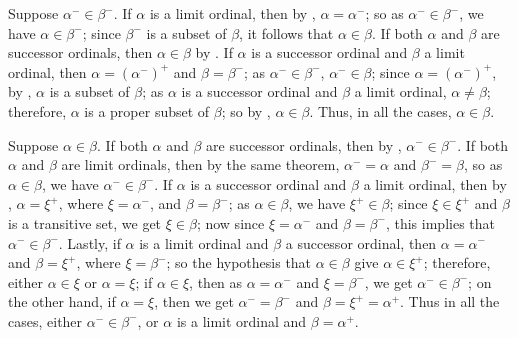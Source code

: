\documentclass{article}
\begin{document}
\begin{solution}[\ref{exe:7tvca54w}]
  \label{sol:45jmdyf7}
  Suppose \(\alpha^- \in \beta^-\).  If \(\alpha\) is a limit ordinal,
  then by , \(\alpha = \alpha^-\); so as
  \(\alpha^- \in \beta^-\), we have \(\alpha \in \beta^-\); since
  \(\beta^-\) is a subset of \(\beta\), it follows that
  \(\alpha \in \beta\).  If both \(\alpha\) and \(\beta\) are
  successor ordinals, then \(\alpha \in \beta\) by
  .  If \(\alpha\) is a successor ordinal and
  \(\beta\) a limit ordinal, then \(\alpha = (\alpha^-)^+\) and
  \(\beta = \beta^-\); as \(\alpha^- \in \beta^-\),
  \(\alpha^- \in \beta\); since \(\alpha = (\alpha^-)^+\), by
  , \(\alpha\) is a subset of \(\beta\); as
  \(\alpha\) is a successor ordinal and \(\beta\) a limit ordinal,
  \(\alpha \neq \beta\); therefore, \(\alpha\) is a proper subset of
  \(\beta\); so by , \(\alpha \in \beta\).  Thus,
  in all the cases, \(\alpha \in \beta\).

  Suppose \(\alpha \in \beta\).  If both \(\alpha\) and \(\beta\) are
  successor ordinals, then by ,
  \(\alpha^- \in \beta^-\).  If both \(\alpha\) and \(\beta\) are
  limit ordinals, then by the same theorem, \(\alpha^- = \alpha\) and
  \(\beta^- = \beta\), so as \(\alpha \in \beta\), we have
  \(\alpha^- \in \beta^-\).  If \(\alpha\) is a successor ordinal and
  \(\beta\) a limit ordinal, then by ,
  \(\alpha = \xi^+\), where \(\xi = \alpha^-\), and
  \(\beta = \beta^-\); as \(\alpha \in \beta\), we have
  \(\xi^+ \in \beta\); since \(\xi \in \xi^+\) and \(\beta\) is a
  transitive set, we get \(\xi \in \beta\); now since
  \(\xi = \alpha^-\) and \(\beta = \beta^-\), this implies that
  \(\alpha^- \in \beta^-\).  Lastly, if \(\alpha\) is a limit ordinal
  and \(\beta\) a successor ordinal, then \(\alpha = \alpha^-\) and
  \(\beta = \xi^+\), where \(\xi = \beta^-\); so the hypothesis that
  \(\alpha \in \beta\) give \(\alpha \in \xi^+\); therefore, either
  \(\alpha \in \xi\) or \(\alpha = \xi\); if \(\alpha \in \xi\), then
  as \(\alpha = \alpha^-\) and \(\xi = \beta^-\), we get
  \(\alpha^- \in \beta^-\); on the other hand, if \(\alpha = \xi\),
  then we get \(\alpha^- = \beta^-\) and \(\beta = \xi^+ = \alpha^+\).
  Thus in all the cases, either \(\alpha^- \in \beta^-\), or
  \(\alpha\) is a limit ordinal and \(\beta = \alpha^+\).
\end{solution}

\bibsection
\end{document}

